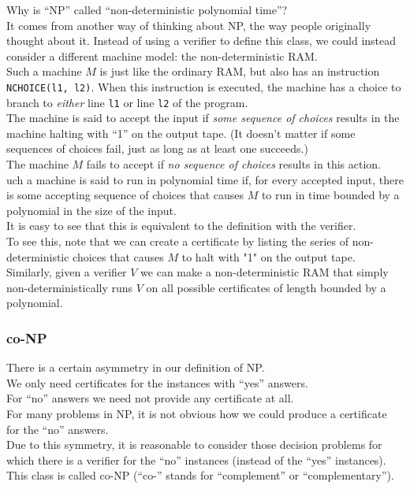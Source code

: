 \documentclass[12pt]{article}
\theoremstyle{plain}
\theoremstyle{definition}
\begin{document}
Why is ``NP'' called ``non-deterministic polynomial time''? \\
It comes from another way of thinking about NP, the way people originally thought about it.
Instead of using a verifier to define this class, we could instead consider a different machine model: the non-deterministic RAM. \\
Such a machine $M$ is just like the ordinary RAM, but also has an instruction \texttt{NCHOICE(l1, l2)}.
When this instruction is executed, the machine has a choice to branch to \emph{either} line \texttt{l1} or line \texttt{l2} of the program. \\
The machine is said to accept the input if \emph{some sequence of choices} results in the machine halting with ``1'' on the output tape. (It doesn't matter if some sequences of choices fail, just as long as at least one succeeds.) \\
The machine $M$ fails to accept if \emph{no sequence of choices} results in this action. \\
uch a machine is said to run in polynomial time if, for every accepted input, there is some accepting sequence of choices that causes $M$ to run in time bounded by a polynomial in the size of the input. \\
It is easy to see that this is equivalent to the definition with the verifier. \\

To see this, note that we can create a certificate by listing the series of non-deterministic choices that causes $M$ to halt with "1" on the output tape. \\
Similarly, given a verifier $V$ we can make a non-deterministic RAM that simply non-deterministically runs $V$ on all possible certificates of length bounded by a polynomial.

\subsubsection{co-NP}
There is a certain asymmetry in our definition of NP. \\
We only need certificates for the instances with ``yes'' answers. \\
For ``no'' answers we need not provide any certificate at all. \\
For many problems in NP, it is not obvious how we could produce a certificate for the ``no'' answers. \\

Due to this symmetry, it is reasonable to consider those decision problems for which there is a verifier for the ``no'' instances (instead of the ``yes'' instances). \\
This class is called co-NP (``co-'' stands for ``complement'' or ``complementary''). \\
\end{document}
